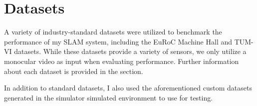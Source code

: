 \section{Datasets}
\label{sec:datasets}
A variety of industry-standard datasets were utilized to benchmark the performance of my SLAM system, including the EuRoC Machine Hall \autocite{burri2016euroc} and TUM-VI \autocite{8593419} datasets. While these datasets provide a variety of sensors, we only utilize a monocular video as input when evaluating performance. Further information about each dataset is provided in the  section.

In addition to standard datasets, I also used the aforementioned custom datasets generated in the simulator simulated environment to use for testing.



